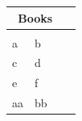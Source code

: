 \vspace*{0.5cm}





\begingroup
\setlength{\tabcolsep}{6pt} %
\renewcommand{\arraystretch}{1.5}
\normalsize
\begin{tabular}{|p{4.0cm}|p{7.0cm}|p{6.5cm}|>{\huge}c}
    
    \hline
     \multicolumn{3}{|c|}{\cellcolor{gray!40} \textbf{\Large Books}}\\[0.5cm]
     \hline
    {\cellcolor{orange!15}{\textcolor{black}{Words}}} & {\cellcolor{orange!15}{\textcolor{black}{Explication}}}&{\cellcolor{orange!15}{\textcolor{black}{L'anglais}}}\\
    \hline
    a& b& \\
    \hline
    c&d& \\
    \hline
    e&f&\\ 
    \hline
    aa&bb&\\
    \hline
\end{tabular}

\endgroup

